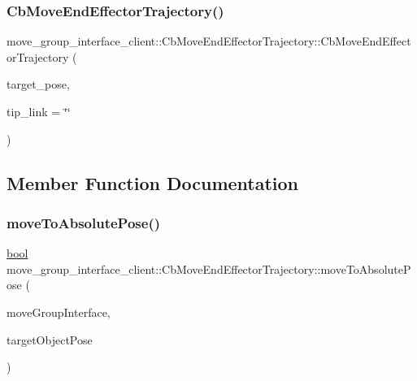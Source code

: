 \subsubsection{\texorpdfstring{Cb\+Move\+End\+Effector\+Trajectory()}{CbMoveEndEffectorTrajectory()}\hspace{0.1cm}{\footnotesize\ttfamily [2/2]}}
{\footnotesize\ttfamily move\+\_\+group\+\_\+interface\+\_\+client\+::\+Cb\+Move\+End\+Effector\+Trajectory\+::\+Cb\+Move\+End\+Effector\+Trajectory (\begin{DoxyParamCaption}\item[{geometry\+\_\+msgs\+::\+Pose\+Stamped}]{target\+\_\+pose,  }\item[{std\+::string}]{tip\+\_\+link = {\ttfamily \char`\"{}\char`\"{}} }\end{DoxyParamCaption})}



\subsection{Member Function Documentation}
\mbox{\label{classmove__group__interface__client_1_1CbMoveEndEffectorTrajectory_a51655226081ce9a7e9095a92b1a635d9}} 
\subsubsection{\texorpdfstring{move\+To\+Absolute\+Pose()}{moveToAbsolutePose()}}
{\footnotesize\ttfamily \hyperlink{classbool}{bool} move\+\_\+group\+\_\+interface\+\_\+client\+::\+Cb\+Move\+End\+Effector\+Trajectory\+::move\+To\+Absolute\+Pose (\begin{DoxyParamCaption}\item[{moveit\+::planning\+\_\+interface\+::\+Move\+Group\+Interface \&}]{move\+Group\+Interface,  }\item[{geometry\+\_\+msgs\+::\+Pose\+Stamped \&}]{target\+Object\+Pose }\end{DoxyParamCaption})\hspace{0.3cm}{\ttfamily [protected]}}

